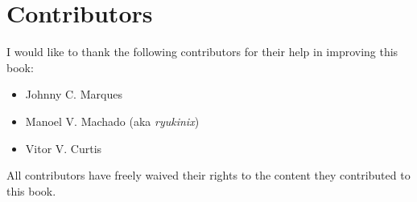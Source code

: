 \newpage

\section*{Contributors}

I would like to thank the following contributors for their help in improving this book:

\begin{itemize}
  \itemsep0em
  \item Johnny C. Marques
  \item Manoel V. Machado (aka \emph{ryukinix})
  \item Vitor V. Curtis
\end{itemize}

All contributors have freely waived their rights to the content they contributed to this book.
